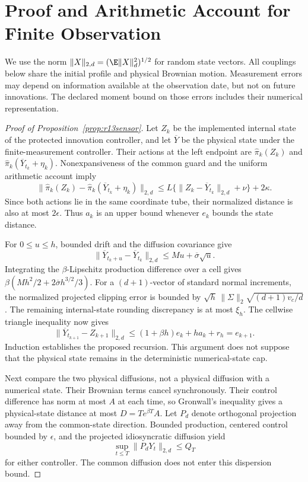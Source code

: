 \section{Proof and Arithmetic Account for Finite Observation}\label{app:r13sensor}
We use the norm $\|X\|_{2,d}=(\E\|X\|_d^2)^{1/2}$ for random state vectors. All couplings below share the initial profile and physical Brownian motion. Measurement errors may depend on information available at the observation date, but not on future innovations. The declared moment bound on those errors includes their numerical representation.

\begin{proof}[Proof of Proposition~\ref{prop:r13sensor}]
Let $Z_k$ be the implemented internal state of the protected innovation controller, and let $\overline Y$ be the physical state under the finite-measurement controller. Their actions at the left endpoint are $\widehat\pi_k(Z_k)$ and $\widehat\pi_k(\overline Y_{t_k}+\eta_k)$. Nonexpansiveness of the common guard and the uniform arithmetic account imply
\[
 \|\widehat\pi_k(Z_k)-\widehat\pi_k(\overline Y_{t_k}+\eta_k)\|_{2,d}
 \leq L\{\|Z_k-\overline Y_{t_k}\|_{2,d}+\nu\}+2\kappa.
\]
Since both actions lie in the same coordinate tube, their normalized distance is also at most $2\epsilon$. Thus $a_k$ is an upper bound whenever $e_k$ bounds the state distance.

For $0\leq u\leq h$, bounded drift and the diffusion covariance give
\[
 \|\overline Y_{t_k+u}-\overline Y_{t_k}\|_{2,d}
        \leq Mu+\overline\sigma\sqrt u.
\]
Integrating the $\beta$-Lipschitz production difference over a cell gives
$\beta(Mh^2/2+2\overline\sigma h^{3/2}/3)$.
For a $(d+1)$-vector of standard normal increments, the normalized projected clipping error is bounded by
$\sqrt h\,\|\Sigma\|_2\sqrt{(d+1)v_c/d}$.
The remaining internal-state rounding discrepancy is at most $\xi_h$. The cellwise triangle inequality now gives
\[
 \|\overline Y_{t_{k+1}}-Z_{k+1}\|_{2,d}
 \leq(1+\beta h)e_k+h a_k+r_h=e_{k+1}.
\]
Induction establishes the proposed recursion. This argument does not suppose that the physical state remains in the deterministic numerical-state cap.

Next compare the two physical diffusions, not a physical diffusion with a numerical state. Their Brownian terms cancel synchronously. Their control difference has norm at most $A$ at each time, so Gronwall's inequality gives a physical-state distance at most $D=T e^{\beta T}A$. Let $P_d$ denote orthogonal projection away from the common-state direction. Bounded production, centered control bounded by $\epsilon$, and the projected idiosyncratic diffusion yield
\[
 \sup_{t\leq T}\|P_dY_t\|_{2,d}\leq Q_T
\]
for either controller. The common diffusion does not enter this dispersion bound.


\end{proof}
